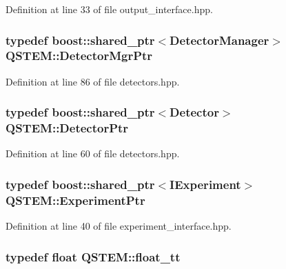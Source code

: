 Definition at line 33 of file output\-\_\-interface.\-hpp.

\hypertarget{namespace_q_s_t_e_m_a7d63bb9157fbc06047c5408ff2b1ee07}{
\subsubsection[{Detector\-Mgr\-Ptr}]{\setlength{\rightskip}{0pt plus 5cm}typedef boost\-::shared\-\_\-ptr$<${\bf Detector\-Manager}$>$ {\bf Q\-S\-T\-E\-M\-::\-Detector\-Mgr\-Ptr}}}\label{namespace_q_s_t_e_m_a7d63bb9157fbc06047c5408ff2b1ee07}


Definition at line 86 of file detectors.\-hpp.

\hypertarget{namespace_q_s_t_e_m_a481d2ce6e8f3dc77e2158d1120a4d6a2}{
\subsubsection[{Detector\-Ptr}]{\setlength{\rightskip}{0pt plus 5cm}typedef boost\-::shared\-\_\-ptr$<${\bf Detector}$>$ {\bf Q\-S\-T\-E\-M\-::\-Detector\-Ptr}}}\label{namespace_q_s_t_e_m_a481d2ce6e8f3dc77e2158d1120a4d6a2}


Definition at line 60 of file detectors.\-hpp.

\hypertarget{namespace_q_s_t_e_m_a726e6914597164e389850f3db0512e7b}{
\subsubsection[{Experiment\-Ptr}]{\setlength{\rightskip}{0pt plus 5cm}typedef boost\-::shared\-\_\-ptr$<${\bf I\-Experiment}$>$ {\bf Q\-S\-T\-E\-M\-::\-Experiment\-Ptr}}}\label{namespace_q_s_t_e_m_a726e6914597164e389850f3db0512e7b}


Definition at line 40 of file experiment\-\_\-interface.\-hpp.

\hypertarget{namespace_q_s_t_e_m_a915d7caa497280d9f927c4ce8d330e47}{
\subsubsection[{float\-\_\-tt}]{\setlength{\rightskip}{0pt plus 5cm}typedef float {\bf Q\-S\-T\-E\-M\-::float\-\_\-tt}}}\label{namespace_q_s_t_e_m_a915d7caa497280d9f927c4ce8d330e47}


